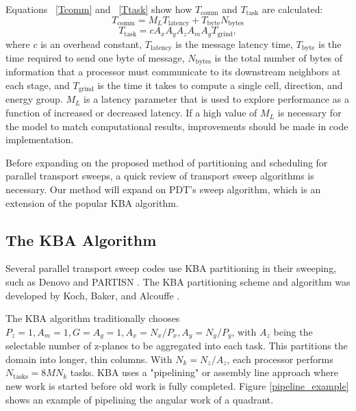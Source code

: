\documentclass[11pt, letterpaper,titlepage,oneside]{article}
\begin{document}
Equations ~\eqref{Tcomm} and ~\eqref{Ttask} show how $T_{\text{comm}}$ and $T_{\text{task}}$ are calculated:
\begin{equation}
T_{\text{comm}} = M_L T_{\text{latency}} + T_{\text{byte}} N_{\text{bytes}}
\label{Tcomm}
\end{equation}
\begin{equation}
T_{\text{task}} = cA_x A_y A_z A_m A_g T_{\text{grind}},
\label{Ttask}
\end{equation}
where $c$ is an overhead constant, $T_{\text{latency}}$ is the message latency time, $T_{\text{byte}}$ is the time required to send one byte of message, $N_{\text{bytes}}$ is the total number of bytes of information that a processor must communicate to its downstream neighbors at each stage, and $T_{\text{grind}}$ is the time it takes to compute a single cell, direction, and energy group. $M_L$ is a latency parameter that is used to explore performance as a function of increased or decreased latency. If a high value of $M_L$ is necessary for the model to match computational results, improvements should be made in code implementation.

Before expanding on the proposed method of partitioning and scheduling for parallel transport sweeps, a quick review of transport sweep algorithms is necessary. Our method will expand on PDT's sweep algorithm\cite{mpadams2013}, which is an extension of the popular KBA algorithm\cite{KBA}.

\subsection{The KBA Algorithm}

Several parallel transport sweep codes use KBA partitioning in their sweeping, such as Denovo \cite{denovo} and PARTISN \cite{partisn}. The KBA partitioning scheme and algorithm was developed by Koch, Baker, and Alcouffe \cite{KBA}.

The KBA algorithm traditionally chooses $P_z = 1, A_m = 1, G = A_g = 1, A_x = N_x/P_x, A_y = N_y/P_y$, with $A_z$ being the selectable number of z-planes to be aggregated into each task. This partitions the domain into longer, thin columns. With $N_k = N_z/A_z$, each processor performs $N_{\text{tasks}} = 8MN_k$ tasks. KBA uses a "pipelining" or assembly line approach where new work is started before old work is fully completed. Figure \ref{pipeline_example} shows an example of pipelining the angular work of a quadrant.
\end{document}
